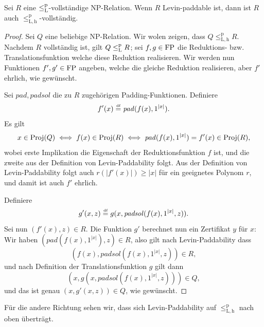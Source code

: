 \begin{lemma}
    Sei $R$ eine $\leq_\mathrm{L}^\mathrm{p}$-vollständige NP-Relation. Wenn $R$ Levin-paddable ist, dann ist 
    $R$ auch $\leq_\mathrm{L,h}^\mathrm p$-vollständig.
\end{lemma}
\begin{proof}
    Sei $Q$ eine beliebige NP-Relation. Wir wolen zeigen, dass $Q\leq_\mathrm{L,h}^\mathrm p R$.
    Nachdem $R$ vollständig ist, gilt $Q\leq_\mathrm{L}^\mathrm{p} R$; sei $f,g\in\mathrm{FP}$ die Reduktions- bzw. Translationsfunktion welche diese Reduktion realisieren. Wir werden nun Funktionen $f', g'\in\mathrm{FP}$ angeben, welche die gleiche Reduktion realisieren, aber $f'$ ehrlich, wie gewünscht.

    Sei $\mathit{pad}, \mathit{padsol}$ die zu $R$ zugehörigen Padding-Funktionen. Definiere
    \[ f'(x) \stackrel{\text{\smash{\tiny df}}}{=}  \mathit{pad}(f(x), 1^{|x|}). \]
    Es gilt
    \[ x\in\operatorname{Proj}(Q) \iff f(x)\in \operatorname{Proj}(R) \iff \mathit{pad}(f(x), 1^{|x|})=f'(x)\in\operatorname{Proj}(R), \]
    wobei erste Implikation die Eigenschaft der Reduktionsfunktion $f$ ist, und die zweite aus der Definition von Levin-Paddability folgt.
    Aus der Definition von  Levin-Paddability folgt auch $r(|f'(x)|)\geq |x|$ für ein geeignetes Polynom $r$, und damit ist auch $f'$ ehrlich.

    Definiere
    \[ g'(x, z) \stackrel{\text{\smash{\tiny df}}}{=}  g(x, \mathit{padsol}(f(x), 1^{|x|}, z)). \]
    Sei nun $(f'(x), z)\in R$. Die Funktion $g'$ berechnet nun ein Zertifikat $y$ für $x$: Wir haben $(\mathit{pad}(f(x), 1^{|x|}), z)\in R$, also gilt nach Levin-Paddability dass \[(f(x), \mathit{padsol}(f(x), 1^{|x|}, z))\in R,\] 
    und nach Definition der Translationsfunktion $g$ gilt dann
    \[(x, g(x, \mathit{padsol}(f(x), 1^{|x|}, z)))\in Q,\]
    und das ist genau $(x, g'(x, z))\in Q$, wie gewünscht.
\end{proof}

Für die andere Richtung sehen wir, dass sich Levin-Paddability auf $\leq_\mathrm{L,h}^\mathrm p$ nach oben überträgt. 


